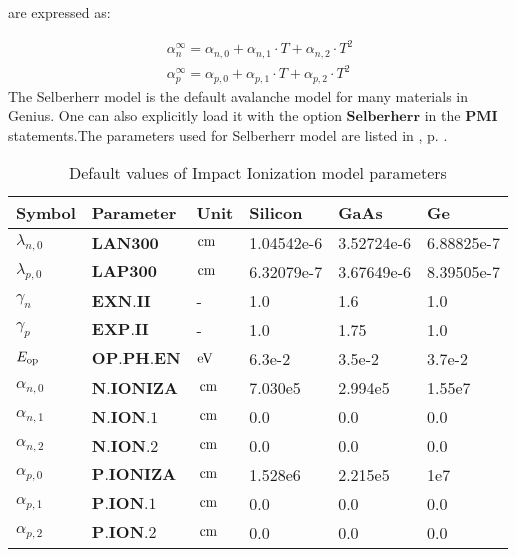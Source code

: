 \documentclass[oneside,12pt]{cgd_book}
\begin{document}
are expressed as:
\par
\begin{subequations}
\begin{align}
 \alpha_n^\infty = \alpha_{n,0} + \alpha_{n,1} \cdot T + \alpha_{n,2} \cdot T^2\\
 \alpha_p^\infty = \alpha_{p,0} + \alpha_{p,1} \cdot T + \alpha_{p,2} \cdot T^2
\end{align}
\end{subequations}
The Selberherr model is the default avalanche model for many materials in Genius. One can also
          explicitly load it with the option $\mathbf{Selberherr}$
in the $\mathbf{PMI}$ statements.The parameters used for Selberherr model are listed in
, p. \pageref{tab:Equation:II:Selberherr:Param}.
\par
\begin{longtable}{llllll}
\caption{\label{tab:Equation:II:Selberherr:Param}Default values of Impact Ionization model parameters} \\
\hline
 Symbol
& Parameter
& Unit
& Silicon
& GaAs
& Ge\\
\hline
 $\lambda_{n,0}$
& $\mathbf{LAN300}$
& $\text{cm}$
& 1.04542e-6
& 3.52724e-6
& 6.88825e-7
\\
 $\lambda_{p,0}$
& $\mathbf{LAP300}$
& $\text{cm}$
& 6.32079e-7
& 3.67649e-6
& 8.39505e-7
\\
 $\gamma_{n}$
& $\mathbf{EXN.II}$
& -
& 1.0
& 1.6
& 1.0
\\
 $\gamma_{p}$
& $\mathbf{EXP.II}$
& -
& 1.0
& 1.75
& 1.0
\\
 $E_{\rm op}$
& $\mathbf{OP.PH.EN}$
& $\text{eV}$
& 6.3e-2
& 3.5e-2
& 3.7e-2
\\
 $\alpha_{n,0}$
& $\mathbf{N.IONIZA}$
& $\,\text{cm}$
& 7.030e5
& 2.994e5
& 1.55e7
\\
 $\alpha_{n,1}$
& $\mathbf{N.ION.1}$
& $\,\text{cm}$
& 0.0
& 0.0
& 0.0
\\
 $\alpha_{n,2}$
& $\mathbf{N.ION.2}$
& $\,\text{cm}$
& 0.0
& 0.0
& 0.0
\\
 $\alpha_{p,0}$
& $\mathbf{P.IONIZA}$
& $\,\text{cm}$
& 1.528e6
& 2.215e5
& 1e7
\\
 $\alpha_{p,1}$
& $\mathbf{P.ION.1}$
& $\,\text{cm}$
& 0.0
& 0.0
& 0.0
\\
 $\alpha_{p,2}$
& $\mathbf{P.ION.2}$
& $\,\text{cm}$
& 0.0
& 0.0
& 0.0\\
\end{longtable}

\par
\end{document}
